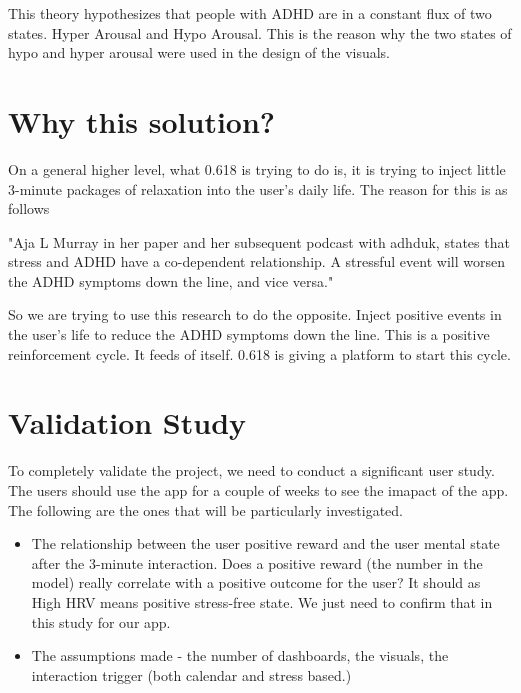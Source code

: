\documentclass[
	fontsize=15pt,
	twoside=false,
	secnumdepth=2
]{kaobook}
\begin{document}
This theory hypothesizes that people with ADHD are in a constant flux of two states. Hyper Arousal and Hypo Arousal. This is the reason why the two states of hypo and hyper arousal were used in the design of the visuals. \\

\section{Why this solution?}

On a general higher level, what 0.618 is trying to do is, it is trying to inject little 3-minute packages of relaxation into the user's daily life. The reason for this is as follows \\

\begin{displayquote}
\textcolor{Sepia}{"Aja L Murray in her paper and her subsequent podcast with adhduk, states that stress and ADHD have a co-dependent relationship. A stressful event will worsen the ADHD symptoms down the line, and vice versa."} 
\end{displayquote}

So we are trying to use this research to do the opposite. Inject positive events in the user's life to reduce the ADHD symptoms down the line. This is a positive reinforcement cycle. It feeds of itself. 0.618 is giving a platform to start this cycle. \\

\section{Validation Study}

To completely validate the project, we need to conduct a significant user study. The users should use the app for a couple of weeks to see the imapact of the app. The following are the ones that will be particularly investigated. \\
\begin{itemize}
  \item The relationship between the user positive reward and the user mental state after the 3-minute interaction. Does a positive reward (the number in the model) really correlate with a positive outcome for the user? It should as High HRV means positive stress-free state. We just need to confirm that in this study for our app.
  \item The assumptions made - the number of dashboards, the visuals, the interaction trigger (both calendar and stress based.)
\end{itemize}
\end{document}
